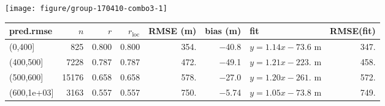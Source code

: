 \documentclass[10pt,notes=all,aspectratio=1610]{beamer}\usepackage[]{graphicx}\usepackage[]{color}
\newenvironment{knitrout}{}{} %
\begin{document}
\begin{frame}[fragile]{\insertsection}
\begin{knitrout}
\color{fgcolor}

{\centering \texttt{[image: figure/group-170410-combo3-1]} 

}



\end{knitrout}
\end{frame}
\begin{frame}[fragile]{\insertsection}
  \begin{adjustbox}{max width=\textwidth}
\begin{tabular}{lrrrrrlr}
  \hline
\hline
pred.rmse & $n$ & $r$ & $r_\text{loc}$ & RMSE (m) & bias (m) & fit & RMSE(fit) \\ 
  \hline
(0,400] &  825 & 0.800 & 0.800 & 354. & $-$40.8 & $y = 1.14 x - 73.6$ m & 347. \\ 
  (400,500] & 7228 & 0.787 & 0.787 & 472. & $-$49.1 & $y = 1.21 x - 223.$ m & 458. \\ 
  (500,600] & 15176 & 0.658 & 0.658 & 578. & $-$27.0 & $y = 1.20 x - 261.$ m & 572. \\ 
  (600,1e+03] & 3163 & 0.557 & 0.557 & 750. & $-$5.74 & $y = 1.05 x - 73.8$ m & 749. \\ 
   \hline
\hline
\end{tabular}

  \end{adjustbox}
\end{frame}
\end{document}
